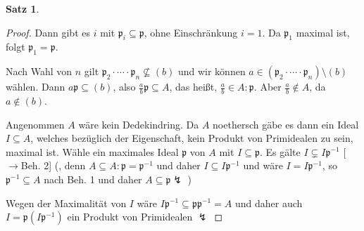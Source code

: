 \documentclass[
twoside=semi,
fontsize=12,
DIV=12, 
cleardoublepage=current,
leqno,
headings=optiontoheadandtoc, 
toc=idx
]{scrbook}
\theoremstyle{definition}
\newtheorem{satz}[definition]{Satz}
\begin{document}
\begin{satz}
\begin{proof}
{   			\noindent Dann gibt es $i$ mit $\mathfrak{p}_i \subseteq \mathfrak{p}$, ohne Einschr\"ankung $i = 1$. Da $\mathfrak{p}_1$ maximal ist, folgt $\mathfrak{p}_1 = \mathfrak{p}$.
   			
   			\noindent Nach Wahl von $n$ gilt $\mathfrak{p}_2 \cdot \cdots \cdot \mathfrak{p}_n \nsubseteq (b)$ und wir k\"onnen $a \in (\mathfrak{p}_2 \cdot \cdots \cdot \mathfrak{p}_n) \setminus (b)$ w\"ahlen. Dann $a\mathfrak{p} \subseteq (b)$, also $\frac{a}{b}\mathfrak{p} \subseteq A$, das hei\ss t, $\frac{a}{b} \in A: \mathfrak{p}$. Aber $\frac{a}{b} \notin A$, da $a \notin (b)$.
			}
		
			\medskip\noindent
			Angenommen $A$ w\"are kein Dedekindring. Da $A$ noethersch g\"abe es dann ein Ideal $I \subseteq A$, welches bez\"uglich der Eigenschaft, kein Produkt von Primidealen zu sein, maximal ist. W\"ahle ein maximales Ideal $\mathfrak{p}$ von $A$ mit $I \subseteq \mathfrak{p}$. Es g\"alte $I \subsetneq I \mathfrak{p}^{-1}$ [$\rightarrow$Beh. 2] (, denn $A \subseteq A: \mathfrak{p} = \mathfrak{p}^{-1}$ und daher $I \subseteq I\mathfrak{p}^{-1}$ und w\"are $I = I\mathfrak{p}^{-1}$, so $\mathfrak{p}^{-1} \subseteq A$ nach Beh. 1 und daher $A \subseteq \mathfrak{p} \lightning$ ) 
			
			\noindent Wegen der Maximalit\"at von $I$ w\"are $I\mathfrak{p}^{-1} \subseteq \mathfrak{p}\mathfrak{p}^{-1} = A$ und daher auch $I = \mathfrak{p}(I\mathfrak{p}^{-1})$ ein Produkt von Primidealen $\lightning$
   		\end{proof}
   	\end{satz}
   	\newpage
   	
\end{document}
